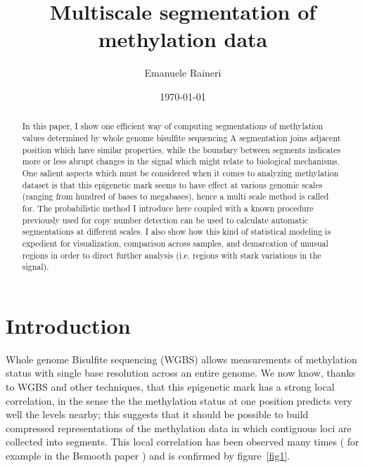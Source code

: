 \documentclass[12pt]{amsart}
\begin{document}
\title{Multiscale segmentation of methylation data}
\author{Emanuele Raineri}
\date{\today}
\maketitle

\begin{abstract}
In this paper, I show one efficient way of computing 
segmentations of methylation values determined by 
whole genome bisulfite sequencing
A segmentation joins adjacent position
which have similar properties, while the boundary between segments 
indicates more or less abrupt changes
in the signal which might relate to biological mechanisms. 
One salient aspects which must be considered when it comes to 
analyzing methylation dataset is that this epigenetic mark seems 
to have effect at various genomic scales 
(ranging from hundred of bases to megabases), hence a multi scale method 
is called for. 
The probabilistic method I introduce here 
coupled with a known procedure previously
used for copy number detection
can be used to calculate automatic segmentations at different scales.
I also show how this 
kind of statistical modeling is expedient for 
visualization, comparison across samples,
and demarcation of unusual regions in 
order to direct further analysis (i.e. regions with stark variations in the signal).
\end{abstract}

\section{Introduction}

Whole genome Bisulfite sequencing (WGBS) allows measurements of methylation 
status with single base resolution across an entire genome. We now know,
thanks to WGBS and other techniques,  
that this epigenetic mark has a strong local correlation,
in the sense the the methylation status at one position predicts 
very well the levels nearby; this suggests that it should be possible
to build compressed representations of the methylation data in which contiguous loci 
are collected into segments.
This local correlation has been observed many times ( for example
in the Bsmooth paper \cite{bsmooth}) and is confirmed by 
figure~\ref{fig1}. 
\end{document}
